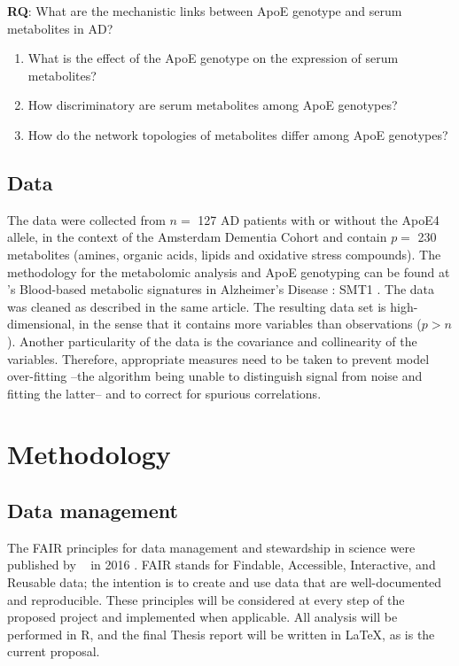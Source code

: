 \documentclass{amsart}
\theoremstyle{plain}
\begin{document}
\textbf{RQ}: What are the mechanistic links between ApoE genotype and serum metabolites in AD?
\begin{enumerate}
    \item What is the effect of the ApoE genotype on the expression of serum metabolites?
    \item How discriminatory are serum metabolites among ApoE genotypes?
    \item How do the network topologies of metabolites differ among ApoE genotypes?
\end{enumerate}

\subsection{Data}
The data were collected from $n =$ 127 AD patients with or without the ApoE4 allele, in the context of the Amsterdam Dementia Cohort \cite{VanDerFlier2018AmsterdamCare, deLeeuw2017Blood-basedDisease} and contain $p =$ 230 metabolites (amines, organic acids, lipids and oxidative stress compounds). The methodology for the metabolomic analysis and ApoE genotyping can be found at \citeauthor{deLeeuw2017Blood-basedDisease}'s  Blood-based metabolic signatures in Alzheimer's Disease \cite{deLeeuw2017Blood-basedDisease}: SMT1 . The data was cleaned as described in the same article. The resulting data set is high-dimensional, in the sense that it contains more variables than observations ($p > n$). Another particularity of the data is the covariance and collinearity of the variables. Therefore, appropriate measures need to be taken to prevent model over-fitting --the algorithm being unable to distinguish signal from noise and fitting the latter--  and to correct for spurious correlations.


\newpage
\section{Methodology}

\subsection{Data management}
The FAIR principles for data management and stewardship in science were published by  ~\citeauthor{Wilkinson2016TheStewardship} in 2016 \cite{Wilkinson2016TheStewardship}. FAIR stands for Findable, Accessible, Interactive, and Reusable data; the intention is to create and use data that are well-documented and reproducible. These principles will be considered at every step of the proposed project and implemented when applicable. All analysis will be performed in R, and the final Thesis report will be written in \LaTeX, as is the current proposal.
\end{document}
